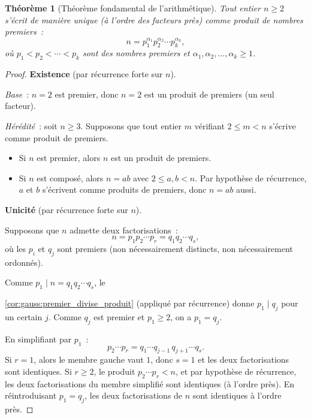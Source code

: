\documentclass[12pt,a4paper,openany]{book}
\theoremstyle{definition}
\theoremstyle{plain}
\newtheorem{theoreme}[definition]{Théorème}
\theoremstyle{remark}
\begin{document}

\begin{theoreme}[Théorème fondamental de l'arithmétique]
\label{thm:fta}
Tout entier $n \geq 2$ s'écrit de manière unique (à l'ordre des facteurs près)
comme produit de nombres premiers~:
\[
  n = p_1^{\alpha_1} p_2^{\alpha_2} \cdots p_k^{\alpha_k},
\]
où $p_1 < p_2 < \cdots < p_k$ sont des nombres premiers et
$\alpha_1, \alpha_2, \ldots, \alpha_k \geq 1$.
\end{theoreme}

\begin{proof}
\textbf{Existence} (par récurrence forte sur $n$).

\emph{Base}~: $n = 2$ est premier, donc $n = 2$ est un produit de premiers (un seul
facteur).

\emph{Hérédité}~: soit $n \geq 3$. Supposons que tout entier $m$ vérifiant
$2 \leq m < n$ s'écrive comme produit de premiers.
\begin{itemize}
  \item Si $n$ est premier, alors $n$ est un produit de premiers.
  \item Si $n$ est composé, alors $n = ab$ avec $2 \leq a, b < n$. Par hypothèse de
    récurrence, $a$ et $b$ s'écrivent comme produits de premiers, donc $n = ab$ aussi.
\end{itemize}

\medskip
\textbf{Unicité} (par récurrence forte sur $n$).

Supposons que $n$ admette deux factorisations~:
\[
  n = p_1 p_2 \cdots p_r = q_1 q_2 \cdots q_s,
\]
où les $p_i$ et $q_j$ sont premiers (non nécessairement distincts, non nécessairement
ordonnés).

Comme $p_1 \mid n = q_1 q_2 \cdots q_s$, le






\ref{cor:gauss:premier_divise_produit} (appliqué par récurrence) donne $p_1 \mid q_j$
pour un certain $j$. Comme $q_j$ est premier et $p_1 \geq 2$, on a $p_1 = q_j$.

En simplifiant par $p_1$~:
\[
  p_2 \cdots p_r = q_1 \cdots q_{j-1}\, q_{j+1} \cdots q_s.
\]
Si $r = 1$, alors le membre gauche vaut $1$, donc $s = 1$ et les deux factorisations
sont identiques. Si $r \geq 2$, le produit $p_2 \cdots p_r < n$, et par hypothèse de
récurrence, les deux factorisations du membre simplifié sont identiques (à l'ordre
près). En réintroduisant $p_1 = q_j$, les deux factorisations de $n$ sont identiques
à l'ordre près.
\end{proof}
\end{document}
